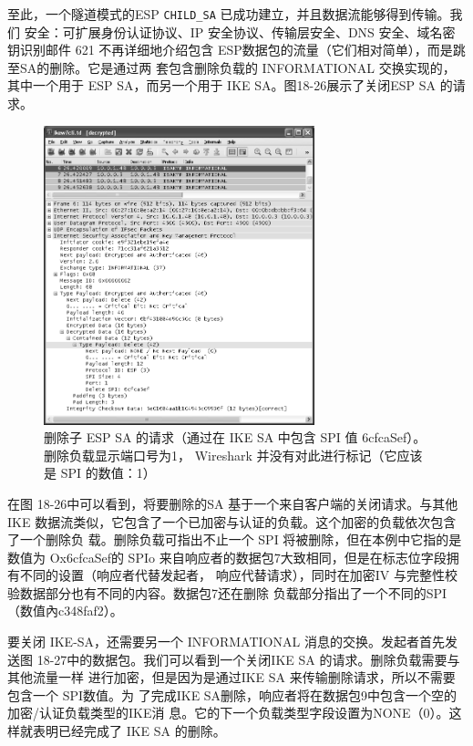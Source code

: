 至此，一个隧道模式的ESP \verb|CHILD_SA| 已成功建立，并且数据流能够得到传输。我们
安全：可扩展身份认证协议、IP 安全协议、传输层安全、DNS 安全、域名密钥识别邮件 621
不再详细地介绍包含 ESP数据包的流量（它们相对简单），而是跳至SA的删除。它是通过两
套包含删除负载的 INFORMATIONAL 交换实现的，其中一个用于 ESP SA，而另一个用于
IKE SA。图18-26展示了关闭ESP SA 的请求。
\begin{figure}[!htb]
    \centering
	\includegraphics[width=0.7\textwidth]{imgs/18/18-26.png}
	\caption{删除子 ESP SA 的请求（通过在 IKE SA 中包含 SPI 值 6cfcaSef）。删除负载显示端口号为1，
            Wireshark 并没有对此进行标记（它应该是 SPI 的数值：1）}
\end{figure}

在图 18-26中可以看到，将要删除的SA 基于一个来自客户端的关闭请求。与其他IKE
数据流类似，它包含了一个已加密与认证的负载。这个加密的负载依次包含了一个删除负
载。删除负载可指出不止一个 SPI 将被删除，但在本例中它指的是数值为 Ox6cfcaSef的 SPIo
来自响应者的数据包7大致相同，但是在标志位字段拥有不同的设置（响应者代替发起者，
响应代替请求），同时在加密IV 与完整性校验数据部分也有不同的内容。数据包7还在删除
负载部分指出了一个不同的SPI（数值內c348faf2）。

要关闭 IKE-SA，还需要另一个 INFORMATIONAL 消息的交换。发起者首先发送图
18-27中的数据包。我们可以看到一个关闭IKE SA 的请求。删除负载需要与其他流量一样
进行加密，但是因为是通过IKE SA 来传输删除请求，所以不需要包含一个 SPI数值。为
了完成IKE SA删除，响应者将在数据包9中包含一个空的加密/认证负载类型的IKE消
息。它的下一个负载类型字段设置为NONE（0）。这样就表明已经完成了 IKE SA 的删除。

